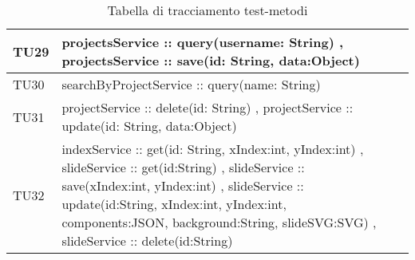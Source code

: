 \begin{table}[H]
\begin{center}
\begin{tabular}{|l|p{}|p{}|c|}

	\toprule
	

		TU29 & projectsService :: query(username: String) , projectsService :: save(id: String, data:Object) \\
	\midrule
		TU30 & searchByProjectService ::  query(name: String) \\
	\midrule
		TU31 & projectService :: delete(id: String) , projectService :: update(id: String, data:Object) \\
	\midrule
		TU32 & indexService :: get(id: String, xIndex:int, yIndex:int) , slideService :: get(id:String) , slideService :: save(xIndex:int, yIndex:int) , slideService :: update(id:String, xIndex:int, yIndex:int, components:JSON, background:String,
slideSVG:SVG) , slideService :: delete(id:String) \\

	\bottomrule
	\end{tabular}
	\end{center}
	\caption{Tabella di tracciamento test-metodi}
\end{table}